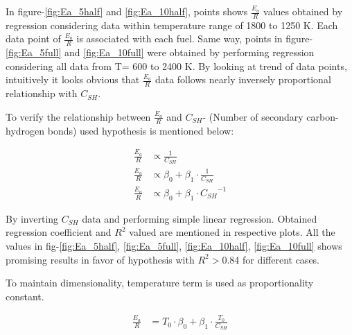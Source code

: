 \documentclass[preprint,12pt]{elsarticle}
\begin{document}
		 In figure-\ref{fig:Ea_5half} and \ref{fig:Ea_10half}, points shows $\frac{E_a}{R}$ values obtained by regression considering data within temperature range of 1800 to 1250 K. Each data point of $\frac{E_a}{R}$ is associated with each fuel. Same way, points in figure-\ref{fig:Ea_5full} and \ref{fig:Ea_10full} were obtained by performing regression considering all data from T= 600 to 2400 K.
		 By looking at trend of data points, intuitively it looks obvious that $\frac{E_a}{R}$ data follows nearly inversely proportional relationship with $C_{SH}$.
		   

	\newpage
		
		To verify the relationship between $\frac{E_a}{R}$ and $C_{SH}$- (Number of secondary carbon-hydrogen bonds) used hypothesis is mentioned below:
		
		\begin{equation}\label{eq:Ea_regre}
		\begin{aligned}
		\frac{E_a}{R} &\propto \frac{1}{C_{SH}}\\
		\frac{E_a}{R} &\propto \beta_0 + \beta_1 \cdot \frac{1}{C_{SH}} \\
		\frac{E_a}{R} &\propto \beta_0 + \beta_1 \cdot {C_{SH}}^{-1}
		\end{aligned}
		\end{equation}
		
		By inverting $C_{SH}$ data and performing simple linear regression. Obtained regression coefficient and $R^2$ valued are mentioned in respective plots. All the values in fig-\ref{fig:Ea_5half}, \ref{fig:Ea_5full}, \ref{fig:Ea_10half}, \ref{fig:Ea_10full} shows promising results in favor of hypothesis with $R^2 > $0.84 for different cases.
		
		To maintain dimensionality, temperature term is used as proportionality constant. 
		
		\begin{equation}\label{eq:formulation_Ea}
		\begin{aligned}
		\frac{E_a}{R} &= T_0 \cdot \beta_0 + \beta_1 \cdot \frac{T_0}{C_{SH}}
		\end{aligned}
		\end{equation}
		
\end{document}
